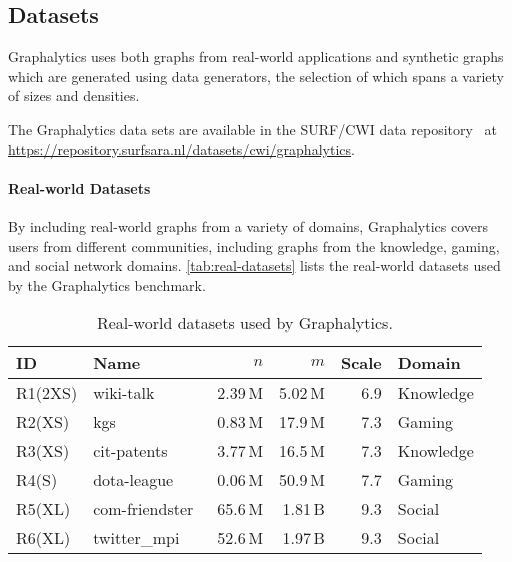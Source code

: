 \subsection{Datasets}\label{sec:definition_datasets}
Graphalytics uses both graphs from real-world applications and synthetic graphs which are generated using data generators, the selection of which spans a variety of sizes and densities.

The Graphalytics data sets are available in the SURF/CWI data repository~\cite{cwi:graphalytics} at \url{https://repository.surfsara.nl/datasets/cwi/graphalytics}.

\paragraph{Real-world Datasets} By including real-world graphs from a variety of domains, Graphalytics covers users from different communities, including graphs from the knowledge, gaming, and social network domains.  \autoref{tab:real-datasets} lists the real-world datasets used by the Graphalytics benchmark.

\begin{table}[h]
\centering
\begin{tabular}{|l|l|r|r|r|l|}
\hline
\textbf{ID} & \textbf{Name} & \textbf{$n$} & \textbf{$m$} & \textbf{Scale} & \textbf{Domain} \\
\hline
R1(2XS) & wiki-talk~\cite{snapnets} & 2.39\,M & 5.02\,M & 6.9 & Knowledge \\
\hline
R2(XS) & kgs~\cite{DBLP:conf/netgames/GuoI12} & 0.83\,M & 17.9\,M & 7.3 & Gaming \\
\hline
R3(XS) & cit-patents~\cite{snapnets} & 3.77\,M & 16.5\,M & 7.3 & Knowledge \\
\hline
R4(S) & dota-league~\cite{DBLP:conf/netgames/GuoI12} & 0.06\,M & 50.9\,M & 7.7 & Gaming \\
\hline
R5(XL) & com-friendster~\cite{snapnets} & 65.6\,M & 1.81\,B & 9.3 & Social \\
\hline
R6(XL) & twitter\_mpi~\cite{DBLP:conf/icwsm/ChaHBG10} & 52.6\,M & 1.97\,B & 9.3 & Social \\
\hline
\end{tabular}
\caption{Real-world datasets used by Graphalytics.}
\label{tab:real-datasets}
\end{table}





